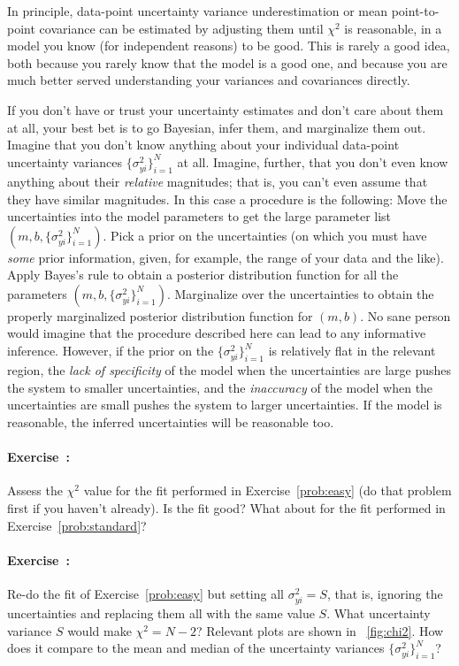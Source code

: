 \documentclass[12pt,twoside]{article}
\newcommand{\problemname}{Exercise}
\newcounter{problem}
\newenvironment{problem}{\paragraph{\problemname~\theproblem:}\refstepcounter{problem}}{}
\newcommand{\setofall}[3]{\{{#1}\}_{{#2}}^{{#3}}}
\newcommand{\allsigmay}{\setofall{\sigma_{yi}^2}{i=1}{N}}
\begin{document}
In principle, data-point uncertainty variance underestimation or mean
point-to-point covariance can be estimated by adjusting them until
$\chi^2$ is reasonable, in a model you know (for independent reasons)
to be good.  This is rarely a good idea, both because you rarely know
that the model is a good one, and because you are much better served
understanding your variances and covariances directly.

If you don't have or trust your uncertainty estimates and don't care
about them at all, your best bet is to go Bayesian, infer them, and
marginalize them out.  Imagine that you don't know anything about your
individual data-point uncertainty variances $\allsigmay$ at all.
Imagine, further, that you don't even know anything about their
\emph{relative} magnitudes; that is, you can't even assume that they
have similar magnitudes.  In this case a procedure is the following:
Move the uncertainties into the model parameters to get the large
parameter list $(m,b,\allsigmay)$.  Pick a prior on the uncertainties
(on which you must have \emph{some} prior information, given, for
example, the range of your data and the like).  Apply Bayes's rule to
obtain a posterior distribution function for all the parameters
$(m,b,\allsigmay)$.  Marginalize over the uncertainties to obtain the
properly marginalized posterior distribution function for $(m,b)$.  No
sane person would imagine that the procedure described here can lead
to any informative inference.  However, if the prior on the
$\allsigmay$ is relatively flat in the relevant region, the \emph{lack
  of specificity} of the model when the uncertainties are large pushes
the system to smaller uncertainties, and the \emph{inaccuracy} of the
model when the uncertainties are small pushes the system to larger
uncertainties.  If the model is reasonable, the inferred uncertainties
will be reasonable too.

\begin{problem}
Assess the $\chi^2$ value for the fit performed in
\problemname~\ref{prob:easy} (do that problem first if you haven't
already).  Is the fit good?  What about for the fit performed in
\problemname~\ref{prob:standard}?
\end{problem}

\begin{problem}\label{prob:chi2}
Re-do the fit of \problemname~\ref{prob:easy} but setting all
$\sigma_{yi}^2=S$, that is, ignoring the uncertainties and replacing
them all with the same value $S$.  What uncertainty variance $S$ would
make $\chi^2 = N-2$?  Relevant plots are shown in
\figurename~\ref{fig:chi2}.  How does it compare to the mean and
median of the uncertainty variances $\allsigmay$?
\end{problem}
\end{document}
